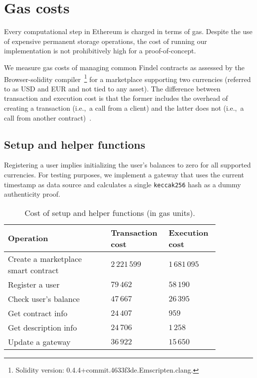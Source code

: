 
\section{Gas costs} \label{sec:Ch10FindelTesting}

Every computational step in Ethereum is charged in terms of gas.
Despite the use of expensive permanent storage operations, the cost of running our implementation is not prohibitively high for a proof-of-concept.

We measure gas costs of managing common Findel contracts as assessed by the Browser-solidity compiler~\cite{BrowserSolidity}\footnote{Solidity version: 0.4.4+commit.4633f3de.Emscripten.clang.} for a marketplace supporting two currencies (referred to as USD and EUR and not tied to any asset).
The difference between transaction and execution cost is that the former includes the overhead of creating a transaction (i.e.,~a call from a client) and the latter does not (i.e.,~a call from another contract)~\cite{Revere2016}.

\subsection{Setup and helper functions}

Registering a user implies initializing the user's balances to zero for all supported currencies.
For testing purposes, we implement a gateway that uses the current timestamp as data source and calculates a single \texttt{keccak256} hash as a dummy authenticity proof.

\begin{table}
	\centering
	\begin{tabular}{| p{0.45\linewidth} | p{0.2\linewidth} | p{0.2\linewidth} |}
		\hline
		\textbf{Operation} & \textbf{Transaction cost} & \textbf{Execution cost} \\
		\hline
		Create a marketplace smart contract & $2\,221\,599$ & $1\,681\,095$ \\
		\hline
		Register a user & $79\,462$ & $58\,190$ \\
		\hline
		Check user's balance & $47\,667$ & $26\,395$ \\
		\hline
		Get contract info & $24\,407$ & $959$ \\
		\hline
		Get description info & $24\,706$ & $1\,258$ \\
		\hline
		Update a gateway & $36\,922$ & $15\,650$ \\
		\hline
	\end{tabular}
	\caption{Cost of setup and helper functions (in gas units).}
	\label{tab:Ch10FindelCost}
\end{table}


